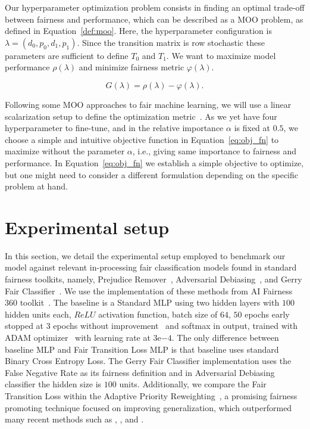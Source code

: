 Our hyperparameter optimization problem consists in finding an optimal trade-off between fairness and performance, which can be described as a MOO problem, as defined in Equation~\ref{def:moo}. Here, the hyperparameter configuration is $\lambda = (d_0, p_0, d_1, p_1)$. Since the transition matrix is row stochastic these parameters are sufficient to define $T_0$ and $T_1$. We want to maximize model performance $\rho(\lambda)$ and minimize fairness metric $\varphi(\lambda)$. 

\begin{equation} \label{eq:obj_fn}
    G(\lambda) = \rho(\lambda) - \varphi(\lambda).
\end{equation}

Following some MOO approaches to fair machine learning, we will use a linear scalarization setup to define the optimization metric~\citep{Schmucker2020,Petrovic2021}. As we yet have four hyperparameter to fine-tune, and in \cite{Cruz2021} the relative importance $\alpha$ is fixed at $0.5$, we choose a simple and intuitive objective function in Equation~\ref{eq:obj_fn} to maximize without the parameter $\alpha$, i.e., giving same importance to fairness and performance. In Equation~\ref{eq:obj_fn} we establish a simple objective to optimize, but one might need to consider a different formulation depending on the specific problem at hand.


\section{Experimental setup} \label{sec:ftl_experimental}

In this section, we detail the experimental setup employed to benchmark our model against relevant in-processing fair classification models found in standard fairness toolkits, namely, Prejudice Remover~\citep{Kamishima2012}, Adversarial Debiasing~\citep{Zhang2018}, and Gerry Fair Classifier~\citep{kearns18a}. We use the implementation of these methods from AI Fairness 360 toolkit~\citep{aif360-oct-2018}. The baseline is a Standard MLP using two hidden layers with $100$ hidden units each, $ReLU$ activation function, batch size of $64$, $50$ epochs early stopped at $3$ epochs without improvement~\citep{Li2020} and softmax in output, trained with ADAM optimizer~\citep{KingmaB14} with learning rate at $3\mathrm{e}{-4}$. The only difference between baseline MLP and Fair Transition Loss MLP is that baseline uses standard Binary Cross Entropy Loss. The Gerry Fair Classifier implementation uses the False Negative Rate as its fairness definition and in Adversarial Debiasing classifier the hidden size is $100$ units. Additionally, we compare the Fair Transition Loss within the Adaptive Priority Reweighting~\cite{HuXT23}, a promising fairness promoting technique focused on improving generalization, which outperformed many recent methods such as \cite{jiang2020identifying}, \cite{mroueh2021fair}, and \cite{roh2020fairbatch}.

